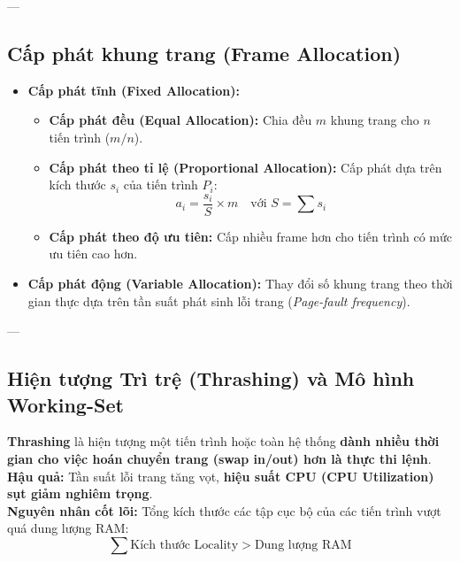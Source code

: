 \documentclass[11pt,a4paper]{article}
\begin{document}
---

\subsection{Cấp phát khung trang (Frame Allocation)}
\begin{itemize}
    \item \textbf{Cấp phát tĩnh (Fixed Allocation):}
    \begin{itemize}
        \item \textbf{Cấp phát đều (Equal Allocation):} Chia đều $m$ khung trang cho $n$ tiến trình ($m/n$).
        \item \textbf{Cấp phát theo tỉ lệ (Proportional Allocation):} Cấp phát dựa trên kích thước $s_i$ của tiến trình $P_i$:
        \begin{equation}
        a_i = \frac{s_i}{S} \times m \quad \text{với } S = \sum s_i
        \end{equation}
        \item \textbf{Cấp phát theo độ ưu tiên:} Cấp nhiều frame hơn cho tiến trình có mức ưu tiên cao hơn.
    \end{itemize}
    \item \textbf{Cấp phát động (Variable Allocation):} Thay đổi số khung trang theo thời gian thực dựa trên tần suất phát sinh lỗi trang (\textit{Page-fault frequency}).
\end{itemize}

---

\subsection{Hiện tượng Trì trệ (Thrashing) và Mô hình Working-Set}

\begin{summarybox}
\textbf{Thrashing} là hiện tượng một tiến trình hoặc toàn hệ thống \textbf{dành nhiều thời gian cho việc hoán chuyển trang (swap in/out) hơn là thực thi lệnh}.\\
\textbf{Hậu quả:} Tần suất lỗi trang tăng vọt, \textbf{hiệu suất CPU (CPU Utilization) sụt giảm nghiêm trọng}.\\
\textbf{Nguyên nhân cốt lõi:} Tổng kích thước các tập cục bộ của các tiến trình vượt quá dung lượng RAM:
\begin{equation*}
\sum \text{Kích thước Locality} > \text{Dung lượng RAM}
\end{equation*}
\end{summarybox}
\end{document}
